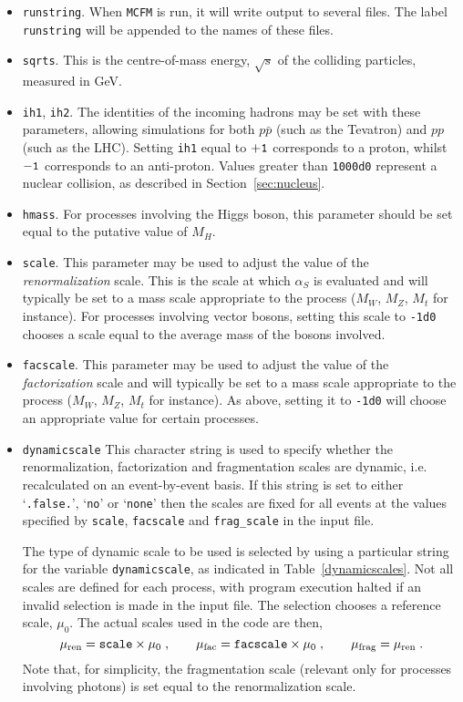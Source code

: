 \documentclass[12pt]{article}
\begin{document}
\begin{itemize}
\item {\tt runstring}.
When {\tt MCFM} is run, it will write output to several files. The
label {\tt runstring} will be appended to the names of these files.

\item {\tt sqrts}. This is the centre-of-mass energy, $\sqrt{s}$ of
the colliding particles, measured in GeV.

\item {\tt ih1}, {\tt ih2}. The identities of the incoming hadrons
may be set with these parameters, allowing simulations for both
$p{\bar p}$ (such as the Tevatron) and $pp$ (such as the LHC). 
Setting {\tt ih1} equal to ${\tt +1}$ corresponds to
a proton, whilst ${\tt -1}$ corresponds to an anti-proton.
Values greater than {\tt 1000d0} represent a nuclear collision,
as described in Section~\ref{sec:nucleus}.

\item {\tt hmass}. For processes involving the Higgs boson, this
parameter should be set equal to the putative value of $M_H$.

\item {\tt scale}. This parameter may be used to adjust the value
of the {\it renormalization} scale. This is the scale
at which $\alpha_S$ is evaluated and will typically be set to
a mass scale appropriate to the process ($M_W$, $M_Z$, $M_t$ for
instance). For processes involving vector bosons, setting this
scale to {\tt -1d0} chooses a scale equal to the average mass of
the bosons involved.

\item {\tt facscale}. This parameter may be used to adjust the value
of the {\it factorization} scale and will typically be set to
a mass scale appropriate to the process ($M_W$, $M_Z$, $M_t$ for
instance). As above, setting it to {\tt -1d0} will choose an
appropriate value for certain processes.

\item {\tt dynamicscale} This character string is used to specify whether
the renormalization, factorization and fragmentation scales are dynamic, i.e. recalculated
on an event-by-event basis. If this string is set to either `{\tt .false.}',
`{\tt no}' or `{\tt none}' then the scales are fixed for all events at the values
specified by {\tt scale}, {\tt facscale} and {\tt frag\_scale} in the input file.

The type of dynamic scale to be used is selected by using a particular string
for the variable {\tt dynamicscale}, as indicated in Table~\ref{dynamicscales}.
Not all scales are defined for each process, with program execution halted if
an invalid selection is made in the input file.
The selection chooses a reference scale, $\mu_0$. The actual scales used in
the code are then,
\begin{equation}
\mu_{\rm ren} = {\tt scale} \times \mu_0 \;, \qquad
\mu_{\rm fac} = {\tt facscale} \times \mu_0 \;, \qquad
\mu_{\rm frag} = \mu_{\rm ren} \;. \nonumber
\end{equation}
Note that, for simplicity, the fragmentation scale (relevant only for processes
involving photons) is set equal to the renormalization scale.


\end{itemize}
\end{document}

